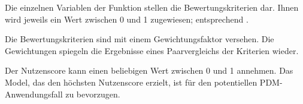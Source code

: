 Die einzelnen Variablen der Funktion stellen die Bewertungskriterien dar. Ihnen wird jeweils ein Wert zwischen 0 und 1 zugewiesen; entsprechend .

Die Bewertungskriterien sind mit einem Gewichtungsfaktor versehen. Die Gewichtungen spiegeln die Ergebnisse eines Paarvergleichs der Kriterien wieder. 

Der Nutzenscore kann einen beliebigen Wert zwischen 0 und 1 annehmen. Das Model, das den höchsten Nutzenscore erzielt, ist für den potentiellen PDM-Anwendungsfall zu bevorzugen.